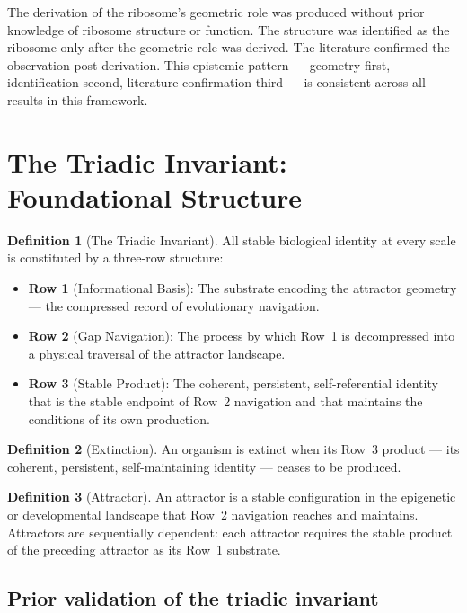 \documentclass[12pt, a4paper]{article}
\theoremstyle{definition}
\newtheorem{definition}{Definition}[section]
\theoremstyle{remark}
\begin{document}
The derivation of the ribosome's geometric role was produced
without prior knowledge of ribosome structure or function.
The structure was identified as the ribosome only after the
geometric role was derived. The literature confirmed the
observation post-derivation. This epistemic pattern ---
geometry first, identification second, literature confirmation
third --- is consistent across all results in this framework.

\section{The Triadic Invariant: Foundational Structure}

\begin{definition}[The Triadic Invariant]
All stable biological identity at every scale is constituted
by a three-row structure:
\begin{itemize}
  \item \textbf{Row 1} (Informational Basis): The substrate
    encoding the attractor geometry --- the compressed record
    of evolutionary navigation.
  \item \textbf{Row 2} (Gap Navigation): The process by which
    Row~1 is decompressed into a physical traversal of the
    attractor landscape.
  \item \textbf{Row 3} (Stable Product): The coherent,
    persistent, self-referential identity that is the stable
    endpoint of Row~2 navigation and that maintains the
    conditions of its own production.
\end{itemize}
\end{definition}

\begin{definition}[Extinction]
An organism is extinct when its Row~3 product --- its
coherent, persistent, self-maintaining identity --- ceases
to be produced.
\end{definition}

\begin{definition}[Attractor]
An attractor is a stable configuration in the epigenetic or
developmental landscape that Row~2 navigation reaches and
maintains. Attractors are sequentially dependent: each
attractor requires the stable product of the preceding
attractor as its Row~1 substrate.
\end{definition}

\subsection{Prior validation of the triadic invariant}
\end{document}
